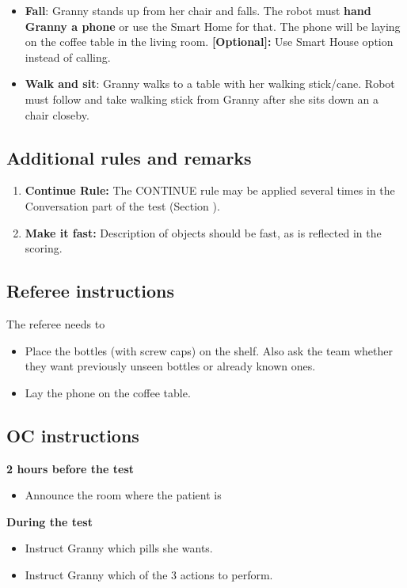 \begin{enumerate}
\begin{itemize}
 		\item \textbf{Fall}: Granny stands up from her chair and falls. The robot must \textbf{hand Granny a phone} or use the Smart Home for that.
								The phone will be laying on the coffee table in the living room.
								\textbf{[Optional]:} Use Smart House option instead of calling.
 		\item \textbf{Walk and sit}: Granny walks to a table with her walking stick/cane. Robot must follow and take walking stick from Granny after she sits down an a chair closeby.
 	\end{itemize}
\end{enumerate}


\subsection{Additional rules and remarks}
\begin{enumerate}
\item \textbf{Continue Rule:} The CONTINUE rule may be applied several times in the Conversation part of the test (Section ).
\item \textbf{Make it fast:} Description of objects should be fast, as is reflected in the scoring.
\end{enumerate}

\subsection{Referee instructions}

The referee needs to
\begin{itemize}
\item Place the bottles (with screw caps) on the shelf. Also ask the team whether they want previously unseen bottles or already known ones.
\item Lay the phone on the coffee table.
\end{itemize}

\subsection{OC instructions}

\textbf{2 hours before the test}
\begin{itemize}
\item Announce the room where the patient is
\end{itemize}
\textbf{During the test}
\begin{itemize}
\item Instruct Granny which pills she wants.
\item Instruct Granny which of the 3 actions to perform.
\end{itemize}

